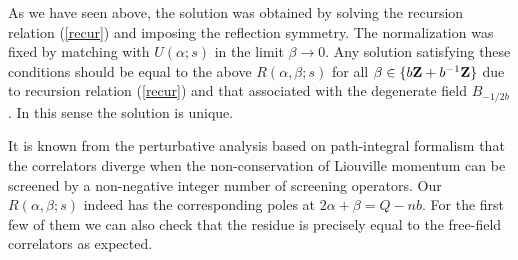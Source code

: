 \documentclass[a4paper,11pt]{article}
\begin{document}
   As we have seen above, the solution was obtained by solving the
 recursion relation (\ref{recur}) and imposing the reflection symmetry.
 The normalization was fixed by matching with $U(\alpha;s)$ in the limit
 $\beta\rightarrow 0$.
 Any solution satisfying these conditions should be equal to the above
 $R(\alpha,\beta;s)$ for all $\beta\in\{b{\bf Z}+b^{-1}{\bf Z}\}$
 due to recursion relation (\ref{recur}) and that associated with
 the degenerate field $B_{-1/2b}$.
 In this sense the solution is unique.

   It is known from the perturbative analysis based on
 path-integral formalism that the correlators diverge when the
 non-conservation of Liouville momentum can be screened by a
 non-negative integer number of screening operators.
 Our $R(\alpha,\beta;s)$ indeed has the corresponding
 poles at $2\alpha+\beta=Q-nb$.
 For the first few of them we can also check that the residue
 is precisely equal to the free-field correlators as expected.

~
 
\end{document}
